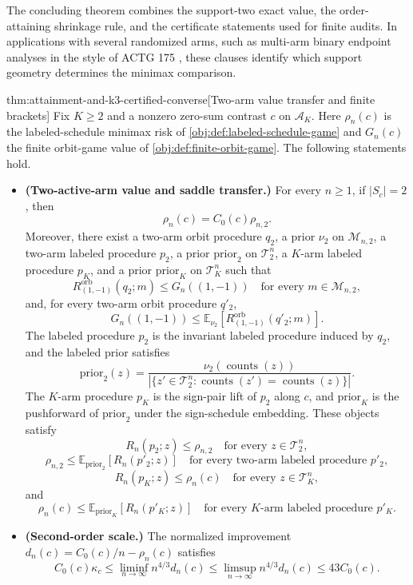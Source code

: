 \documentclass[11pt]{article}
\begin{document}
The concluding theorem combines the support-two exact value, the order-attaining shrinkage rule, and the certificate statements used for finite audits. In applications with several randomized arms, such as multi-arm binary endpoint analyses in the style of ACTG 175 \citep{hammer_et_al_1996_actg175}, these clauses identify which support geometry determines the minimax comparison.

\begin{theoremv}{thm:attainment-and-k3-certified-converse}[Two-arm value transfer and finite brackets]
Fix \(K\ge 2\) and a nonzero zero-sum contrast \(c\) on \(\mathcal A_K\). Here \(\rho_n(c)\) is the labeled-schedule minimax risk of \cref{obj:def:labeled-schedule-game} and \(G_n(c)\) the finite orbit-game value of \cref{obj:def:finite-orbit-game}.
The following statements hold.
\begin{itemize}
\item \textbf{(Two-active-arm value and saddle transfer.)} For every \(n\ge 1\), if \(|S_c|=2\), then
\[
\rho_n(c)=C_0(c)\rho_{n,2}.
\]
Moreover, there exist a two-arm orbit procedure \(q_2\), a prior \(\nu_2\) on \(\mathcal M_{n,2}\), a two-arm labeled procedure \(p_2\), a prior \(\mathrm{prior}_2\) on \(\mathcal T_2^n\), a \(K\)-arm labeled procedure \(p_K\), and a prior \(\mathrm{prior}_K\) on \(\mathcal T_K^n\) such that
\[
R^{\mathrm{orb}}_{(1,-1)}(q_2;m)\le G_n((1,-1))
\quad\text{for every }m\in\mathcal M_{n,2},
\]
and, for every two-arm orbit procedure \(q'_2\),
\[
G_n((1,-1))
\le
\mathbb E_{\nu_2}\!\left[R^{\mathrm{orb}}_{(1,-1)}(q'_2;m)\right].
\]
The labeled procedure \(p_2\) is the invariant labeled procedure induced by \(q_2\), and the labeled prior satisfies
\[
\mathrm{prior}_2(z)=
\frac{\nu_2(\operatorname{counts}(z))}
     {|\{z'\in\mathcal T_2^n:\operatorname{counts}(z')=\operatorname{counts}(z)\}|}.
\]
The \(K\)-arm procedure \(p_K\) is the sign-pair lift of \(p_2\) along \(c\), and \(\mathrm{prior}_K\) is the pushforward of \(\mathrm{prior}_2\) under the sign-schedule embedding. These objects satisfy
\[
R_n(p_2;z)\le \rho_{n,2}
\quad\text{for every }z\in\mathcal T_2^n,
\]
\[
\rho_{n,2}\le
\mathbb E_{\mathrm{prior}_2}\!\left[R_n(p'_2;z)\right]
\quad\text{for every two-arm labeled procedure }p'_2,
\]
\[
R_n(p_K;z)\le \rho_n(c)
\quad\text{for every }z\in\mathcal T_K^n,
\]
and
\[
\rho_n(c)\le
\mathbb E_{\mathrm{prior}_K}\!\left[R_n(p'_K;z)\right]
\quad\text{for every \(K\)-arm labeled procedure }p'_K.
\]

\item \textbf{(Second-order scale.)} The normalized improvement \(d_n(c)=C_0(c)/n-\rho_n(c)\) satisfies
\[
C_0(c)\kappa_c
\le
\liminf_{n\to\infty} n^{4/3}d_n(c)
\le
\limsup_{n\to\infty} n^{4/3}d_n(c)
\le
43C_0(c).
\]


\end{itemize}
\end{theoremv}
\end{document}
